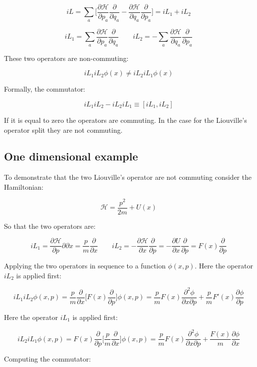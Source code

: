 	$$iL = \sum\limits_a\biggl[\frac{\partial\mathcal{H}}{\partial p_a}\frac{\partial}{\partial q_a} - \frac{\partial\mathcal{H}}{\partial q_a}\frac{\partial}{\partial p_a}\biggr] = iL_1 + iL_2$$

	$$iL_1 = \sum\limits_a\frac{\partial\mathcal{H}}{\partial p_a}\frac{\partial}{\partial q_a} \qquad iL_2 = -\sum\limits_a\frac{\partial\mathcal{H}}{\partial q_a}\frac{\partial}{\partial p_a}$$

	These two operators are non-commuting:

	$$iL_1iL_2\phi(x)\neq iL_2iL_1\phi(x)$$

	Formally, the commutator:

	$$iL_1iL_2-iL_2iL_1\equiv [iL_1, iL_2]$$

	If it is equal to zero the operators are commuting.
	In the case for the Liouville's operator split they are not commuting.

	\subsection{One dimensional example}
	To demonstrate that the two Liouville's operator are not commuting consider the Hamiltonian:

	$$\mathcal{H} = \frac{p^2}{2m} + U(x)$$

	So that the two operators are:

	$$iL_1 = \frac{\partial\mathcal{H}}{\partial p}{\partial}{\partial x} = \frac{p}{m}\frac{\partial}{\partial x}\qquad iL_2 = -\frac{\partial\mathcal{H}}{\partial x}\frac{\partial}{\partial p} = -\frac{\partial U}{\partial x}\frac{\partial}{\partial p} = F(x)\frac{\partial}{\partial p}$$

	Applying the two operators in sequence to a function $\phi(x, p)$.
	Here the operator $iL_2$ is applied first:

	$$iL_1iL_2\phi(x, p) = \frac{p}{m}\frac{\partial}{\partial x}\biggl[F(x)\frac{\partial}{\partial p}\biggr]\phi(x, p) = \frac{p}{m}F(x)\frac{\partial^2\phi}{\partial x\partial p} + \frac{p}{m}F'(x)\frac{\partial\phi}{\partial p}$$

	Here the operator $iL_1$ is applied first:

	$$iL_2iL_1\phi(x, p) = F(x)\frac{\partial}{\partial p}\biggl[\frac{p}{m}\frac{\partial}{\partial x}\biggr]\phi(x, p) = \frac{p}{m}F(x)\frac{\partial^2\phi}{\partial x\partial p} + \frac{F(x)}{m}\frac{\partial \phi}{\partial x}$$

	Computing the commutator:


